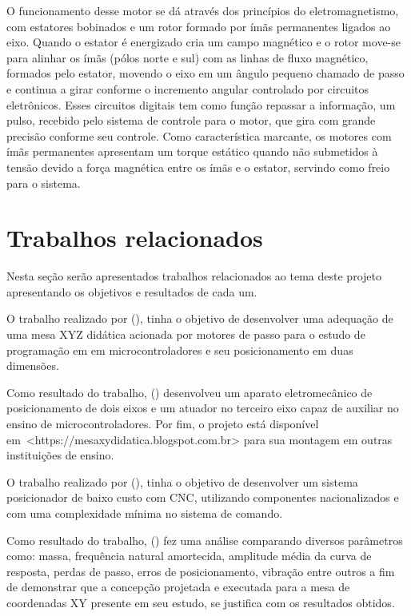 O funcionamento desse motor se dá através dos princípios do eletromagnetismo, com estatores bobinados e um rotor 
formado por ímãs permanentes ligados ao eixo. Quando o estator é energizado cria um campo magnético e o rotor 
move-se para alinhar os ímãs (pólos norte e sul) com as linhas de fluxo magnético, formados pelo estator, 
movendo o eixo em um ângulo pequeno chamado de passo e continua a girar conforme o incremento angular controlado 
por circuitos eletrônicos. Esses circuitos digitais tem como função repassar a informação, um pulso, recebido 
pelo sistema de controle para o motor, que gira com grande precisão conforme seu controle. Como característica 
marcante, os motores com ímãs permanentes apresentam um torque estático quando não submetidos à tensão devido 
a força magnética entre os ímãs e o estator, servindo como freio para o sistema.
 
\section{Trabalhos relacionados}\label{sec:trabalhos}

Nesta seção serão apresentados trabalhos relacionados ao tema deste projeto apresentando os objetivos e resultados 
de cada um.

O trabalho realizado por \citeauthor{butignol2017adequaccao} (\citeyear{butignol2017adequaccao}), 
tinha o objetivo de desenvolver uma adequação de uma mesa XYZ didática acionada por motores 
de passo para o estudo de programação em em microcontroladores e seu posicionamento em duas dimensões.

Como resultado do trabalho, \citeauthor{butignol2017adequaccao} (\citeyear{butignol2017adequaccao}) 
desenvolveu um aparato eletromecânico de posicionamento de dois eixos e um atuador no terceiro eixo 
capaz de auxiliar no ensino de microcontroladores. Por fim, o projeto está disponível 
em~<https://mesaxydidatica.blogspot.com.br> para sua montagem em outras instituições de ensino.

O trabalho realizado por \citeauthor{camargo1988mesa} (\citeyear{camargo1988mesa}), tinha o objetivo de 
desenvolver um sistema posicionador de baixo custo com \ac{CNC}, utilizando componentes 
nacionalizados e com uma complexidade mínima no sistema de comando.

Como resultado do trabalho, \citeauthor{camargo1988mesa} (\citeyear{camargo1988mesa}) fez uma análise 
comparando diversos parâmetros como: massa, frequência natural amortecida, amplitude média da curva de 
resposta, perdas de passo, erros de posicionamento, vibração entre outros a fim de demonstrar que a 
concepção projetada e executada para a mesa de coordenadas XY presente em seu estudo, se 
justifica com os resultados obtidos.


